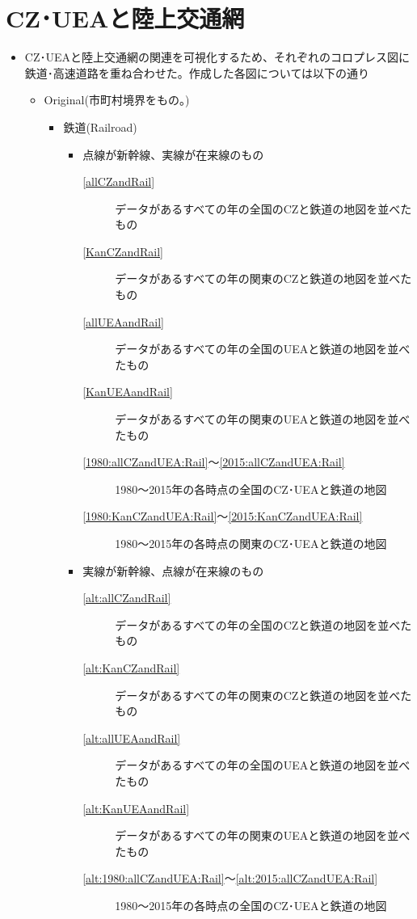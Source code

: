 \documentclass{ltjsarticle}
\begin{document}
\section{CZ･UEAと陸上交通網}
\begin{itemize}
  \item CZ･UEAと陸上交通網の関連を可視化するため、それぞれのコロプレス図に鉄道･高速道路を重ね合わせた。作成した各図については以下の通り
  \begin{itemize}
    \item Original(市町村境界をもの。)
    \begin{itemize}
      \item 鉄道(Railroad)
      \begin{itemize}
        \item 点線が新幹線、実線が在来線のもの
        \begin{description}
          \item[\ref{allCZandRail}] データがあるすべての年の全国のCZと鉄道の地図を並べたもの
          \item[\ref{KanCZandRail}] データがあるすべての年の関東のCZと鉄道の地図を並べたもの
          \item[\ref{allUEAandRail}] データがあるすべての年の全国のUEAと鉄道の地図を並べたもの
          \item[\ref{KanUEAandRail}] データがあるすべての年の関東のUEAと鉄道の地図を並べたもの
          \item[\ref{1980:allCZandUEA:Rail}～\ref{2015:allCZandUEA:Rail}] 1980～2015年の各時点の全国のCZ･UEAと鉄道の地図
          \item[\ref{1980:KanCZandUEA:Rail}～\ref{2015:KanCZandUEA:Rail}] 1980～2015年の各時点の関東のCZ･UEAと鉄道の地図
        \end{description}
        \item 実線が新幹線、点線が在来線のもの
        \begin{description}
          \item[\ref{alt:allCZandRail}] データがあるすべての年の全国のCZと鉄道の地図を並べたもの
          \item[\ref{alt:KanCZandRail}] データがあるすべての年の関東のCZと鉄道の地図を並べたもの
          \item[\ref{alt:allUEAandRail}] データがあるすべての年の全国のUEAと鉄道の地図を並べたもの
          \item[\ref{alt:KanUEAandRail}] データがあるすべての年の関東のUEAと鉄道の地図を並べたもの
          \item[\ref{alt:1980:allCZandUEA:Rail}～\ref{alt:2015:allCZandUEA:Rail}] 1980～2015年の各時点の全国のCZ･UEAと鉄道の地図

\end{description}
\end{itemize}
\end{itemize}
\end{itemize}
\end{itemize}
\end{document}

